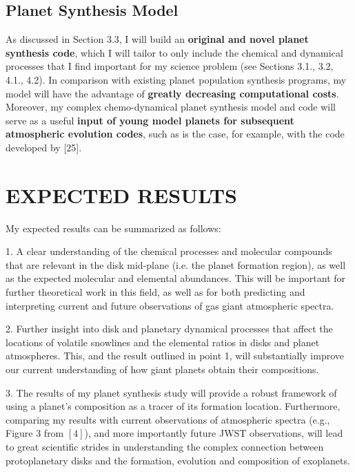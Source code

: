 \documentclass[12pt, letterpaper]{article}
\begin{document}
\subsection{Planet Synthesis Model}

As discussed in Section 3.3, I will build an \textbf{original and novel planet synthesis code}, which I will tailor to only include the chemical and dynamical processes that I find important for my science problem (see Sections 3.1., 3.2, 4.1., 4.2). In comparison with existing planet population synthesis programs, my model will have the advantage of \textbf{greatly decreasing computational costs}. Moreover, my complex chemo-dynamical planet synthesis model and code will serve as a useful \textbf{input of young model planets for subsequent atmospheric evolution codes}, such as is the case, for example, with the code developed by [25].  


\section{EXPECTED RESULTS}


My expected results can be summarized as follows:

1. A clear understanding of the chemical processes and molecular compounds that are relevant in the disk mid-plane (i.e. the planet formation region), as well as the expected molecular and elemental abundances. This will be important for further theoretical work in this field, as well as for both predicting and interpreting current and future observations of gas giant atmospheric spectra.

2. Further insight into disk and planetary dynamical processes that affect the locations of volatile snowlines and the elemental ratios in disks and planet atmospheres. This, and the result outlined in point 1, will substantially improve our current understanding of how giant planets obtain their compositions. 

3. The results of my planet synthesis study will provide a robust framework of using a planet's composition as a tracer of its formation location. Furthermore, comparing my results with current observations of atmospheric spectra (e.g., Figure 3 from $[4]$), and more importantly future JWST observations, will lead to great scientific strides in understanding the complex connection between protoplanetary disks and the formation, evolution and composition of exoplanets. 
\end{document}
